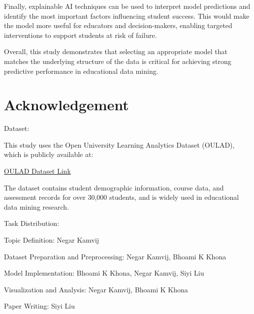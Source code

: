 \documentclass[conference]{IEEEtran}
\begin{document}
Finally, explainable AI techniques can be used to interpret model predictions and identify the most important factors influencing student success. This would make the model more useful for educators and decision-makers, enabling targeted interventions to support students at risk of failure.

Overall, this study demonstrates that selecting an appropriate model that matches the underlying structure of the data is critical for achieving strong predictive performance in educational data mining.
\section*{Acknowledgement}

Dataset:

This study uses the Open University Learning Analytics Dataset (OULAD), which is publicly available at:

\href{https://archive.ics.uci.edu/dataset/349/open+university+learning+analytics+dataset}{OULAD Dataset Link}

The dataset contains student demographic information, course data, and assessment records for over 30,000 students, and is widely used in educational data mining research.

Task Distribution:

Topic Definition: Negar Kamvij

Dataset Preparation and Preprocessing: Negar Kamvij, Bhoami K Khona

Model Implementation: Bhoami K Khona, Negar Kamvij, Siyi Liu

Visualization and Analysis: Negar Kamvij, Bhoami K Khona

Paper Writing: Siyi Liu
\end{document}
